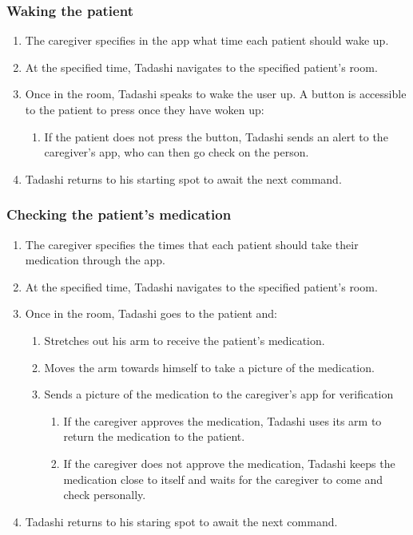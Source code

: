 \documentclass{article}
\begin{document}
\subsubsection{Waking the patient}
\begin{enumerate}
\item The caregiver specifies in the app what time each patient should wake up.
\item At the specified time, Tadashi navigates to the specified patient's room.
\item Once in the room, Tadashi speaks to wake the user up. A button is accessible to the patient to press once they have woken up:
  \begin{enumerate} 
  \item If the patient does not press the button, Tadashi sends an alert to the caregiver's app, who can then go check on the person. 
  \end{enumerate}
\item Tadashi returns to his starting spot to await the next command. 
\end{enumerate}

\subsubsection{Checking the patient's medication}
\begin{enumerate}
\item The caregiver specifies the times that each patient should take their medication through the app.
\item At the specified time, Tadashi navigates to the specified patient's room. 
\item Once in the room, Tadashi goes to the patient and:
  \begin{enumerate}
  \item Stretches out his arm to receive the patient's medication.
  \item Moves the arm towards himself to take a picture of the medication.
  \item Sends a picture of the medication to the caregiver's app for verification
    \begin{enumerate}
    \item If the caregiver approves the medication, Tadashi uses its arm to return the medication to the patient. 
    \item If the caregiver does not approve the medication, Tadashi keeps the medication close to itself and waits for the caregiver to come and check personally.
    \end{enumerate}
  \end{enumerate}
\item Tadashi returns to his staring spot to await the next command.
\end{enumerate}
\end{document}

